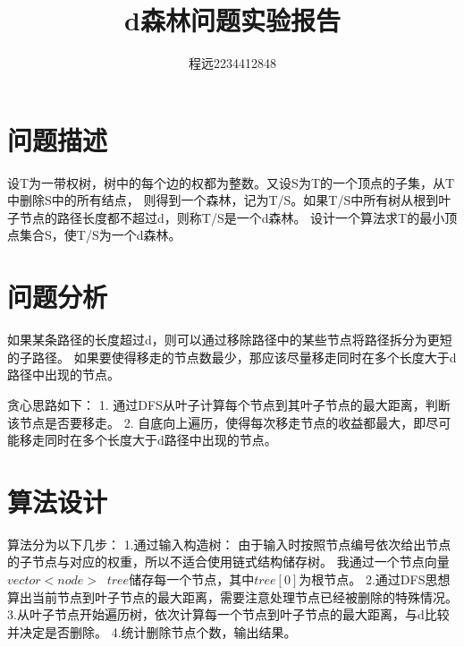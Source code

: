 \documentclass[UTF8]{ctexart}
\begin{document}
\title{\vspace{0cm}d森林问题实验报告}
\author{程远2234412848}
\date{}
\maketitle
\tableofcontents
\newpage

\section{问题描述}
设T为一带权树，树中的每个边的权都为整数。又设S为T的一个顶点的子集，从T中删除S中的所有结点，
则得到一个森林，记为T/S。如果T/S中所有树从根到叶子节点的路径长度都不超过d，则称T/S是一个d森林。
设计一个算法求T的最小顶点集合S，使T/S为一个d森林。

\section{问题分析}
如果某条路径的长度超过d，则可以通过移除路径中的某些节点将路径拆分为更短的子路径。
如果要使得移走的节点数最少，那应该尽量移走同时在多个长度大于d路径中出现的节点。

贪心思路如下：
1. 通过DFS从叶子计算每个节点到其叶子节点的最大距离，判断该节点是否要移走。
2. 自底向上遍历，使得每次移走节点的收益都最大，即尽可能移走同时在多个长度大于d路径中出现的节点。

\section{算法设计}
算法分为以下几步：
1.通过输入构造树：
由于输入时按照节点编号依次给出节点的子节点与对应的权重，所以不适合使用链式结构储存树。
我通过一个节点向量$vector<\!node\!>\;\;tree$储存每一个节点，其中$tree[0]$为根节点。
2.通过DFS思想算出当前节点到叶子节点的最大距离，需要注意处理节点已经被删除的特殊情况。
3.从叶子节点开始遍历树，依次计算每一个节点到叶子节点的最大距离，与d比较并决定是否删除。
4.统计删除节点个数，输出结果。
\end{document}
